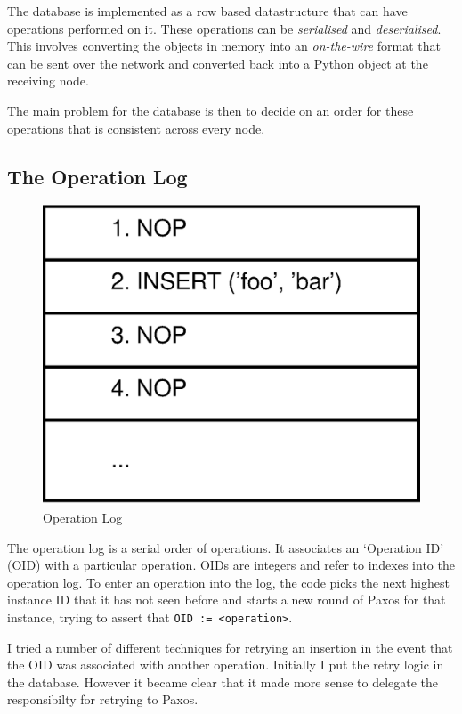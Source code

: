 \documentclass[12pt,twoside,notitlepage]{report}
\begin{document}
The database is implemented as a row based datastructure that can have operations performed on it.
These operations can be \emph{serialised} and \emph{deserialised}. This involves converting the
objects in memory into an \emph{on-the-wire} format that can be sent over the network and
converted back into a Python object at the receiving node.

The main problem for the database is then to decide on an order for these operations that is
consistent across every node.

\subsection{The Operation Log}

\begin{figure}[htb]
\centering
\includegraphics[scale=0.5]{figs/op-log.eps}
\caption{\label{fig:op-log}Operation Log}
\end{figure}

The operation log is a serial order of operations. It associates an `Operation ID' (OID)
with a particular operation. OIDs are integers and refer to indexes into the operation log. To
enter an operation into the log, the code picks the next highest instance ID that it has not seen
before and starts a new round of Paxos for that instance, trying to assert that
\verb$OID := <operation>$.

I tried a number of different techniques for retrying an insertion in the event that the OID was
associated with another operation. Initially I put the retry logic in the database. However it
became clear that it made more sense to delegate the responsibilty for retrying to Paxos.
\end{document}
